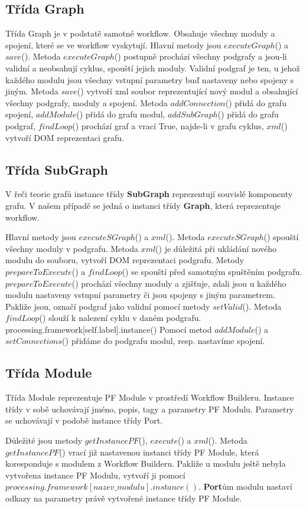 \subsection*{Třída Graph}
Třída Graph je v podstatě samotné workflow. Obsahuje všechny moduly a spojení, které se ve workflow vyskytují. Hlavní metody jsou $executeGraph$() a $save$(). Metoda $executeGraph$() postupně prochází všechny podgrafy a jsou-li validní a neobsahují cyklus, spouští jejich moduly. Validní podgraf je ten, u jehož každého modulu jsou všechny vstupní parametry buď nastaveny nebo spojeny s jiným. Metoda $save$() vytvoří xml soubor reprezentující nový modul a obsahující všechny podgrafy, moduly a spojení. Metoda $addConnection$() přidá do grafu spojení, $addModule$() přidá do grafu modul, $addSubGraph$() přidá do grafu podgraf, $findLoop$() prochází graf a vrací True, najde-li v grafu cyklus, $xml$() vytvoří DOM reprezentaci grafu.

\subsection*{Třída SubGraph}
V řeči teorie grafů instance třídy \textbf{SubGraph} reprezentují souvislé komponenty grafu. V našem případě se jedná o instanci třídy \textbf{Graph}, která reprezentuje workflow.

Hlavní metody jsou $executeSGraph$() a $xml$(). Metoda $executeSGraph$() spouští všechny moduly v podgrafu. Metoda $xml$() je důležitá při ukládání nového modulu do souboru, vytvoří DOM reprezentaci podgrafu. Metody $prepareToExecute$() a $findLoop$() se spouští před samotným spuštěním podgrafu. $prepareToExecute$() prochází všechny moduly a zjišťuje, zdali jsou u každého modulu nastaveny vstupní parametry či jsou spojeny s jiným parametrem. Pakliže jsou, označí podgraf jako validní pomocí metody $setValid$(). Metoda $findLoop$() slouží k nalezení cyklu v daném podgrafu. 
processing.framework[self.label].instance()
Pomocí metod $addModule$() a $setConnections$() přidáme do podgrafu modul, resp. nastavíme spojení.

\subsection*{Třída Module}
Třída Module reprezentuje PF Module v prostředí Workflow Builderu. Instance třídy v sobě uchovávají jméno, popis, tagy a parametry PF Modulu. Parametry se uchovávají v podobě instance třídy Port. 

Důležité jsou metody $getInstancePF$(), $execute$() a $xml$(). Metoda $getInstancePF$() vrací již nastavenou instanci třídy PF Module, která koresponduje s modulem z Workflow Builderu. Pakliže u modulu ještě nebyla vytvořena instance PF Modulu, vytvoří ji pomocí $processing.framework[nazev\_modulu].instance()$. \textbf{Port}ům modulu nastaví odkazy na parametry právě vytvořené instance třídy PF Module. 


